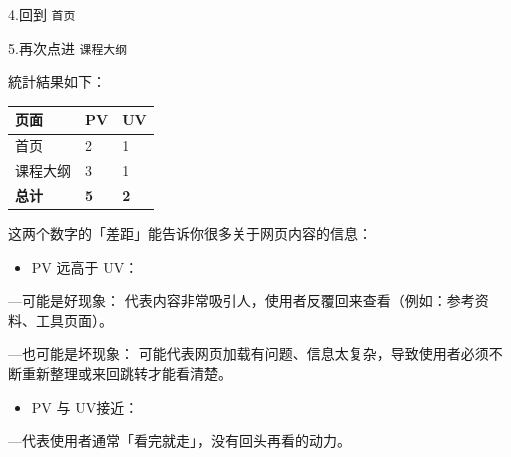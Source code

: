 \documentclass[
]{ctexart}
\newcounter{none} %
\providecommand{\tightlist}{%
  \setlength{\itemsep}{0pt}\setlength{\parskip}{0pt}}
\begin{document}
4.回到 \texttt{首页}

5.再次点进 \texttt{课程大纲}

統計結果如下：

{\def\LTcaptype{none} %
\begin{longtable}[]{@{}lll@{}}
\toprule\noalign{}
页面 & PV & UV \\
\midrule\noalign{}
\endhead
\bottomrule\noalign{}
\endlastfoot
首页 & 2 & 1 \\
课程大纲 & 3 & 1 \\
\textbf{总计} & \textbf{5} & \textbf{2} \\
\end{longtable}
}

这两个数字的「差距」能告诉你很多关于网页内容的信息：

\begin{itemize}
\tightlist
\item
  PV 远高于 UV：
\end{itemize}

---可能是好现象：
代表内容非常吸引人，使用者反覆回来查看（例如：参考资料、工具页面）。

---也可能是坏现象：
可能代表网页加载有问题、信息太复杂，导致使用者必须不断重新整理或来回跳转才能看清楚。

\begin{itemize}
\tightlist
\item
  PV 与 UV接近：
\end{itemize}

---代表使用者通常「看完就走」，没有回头再看的动力。
\end{document}

